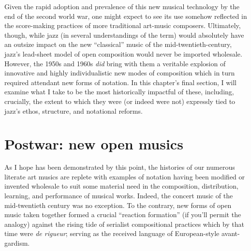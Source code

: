     Given the rapid adoption and prevalence of this new musical technology by the end of the second world war, one might expect to see its use somehow reflected in the score-making practices of more traditional art-music composers. Ultimately, though, while jazz (in several understandings of the term) would absolutely have an outsize impact on the new ``classical'' music of the mid-twentieth-century, jazz's lead-sheet model of open composition would never be imported wholesale. However, the 1950s and 1960s \textit{did} bring with them a veritable explosion of innovative and highly individualistic new modes of composition which in turn required attendant new forms of notation. In this chapter's final section, I will examine what I take to be the most historically impactful of these, including, crucially, the extent to which they were (or indeed were not) expressly tied to jazz's ethos, structure, and notational reforms.

   


        
    
    \section[Postwar: new open musics]{Postwar: new open musics}

    As I hope has been demonstrated by this point, the histories of our numerous literate art musics are replete with examples of notation having been modified or invented wholesale to suit some material need in the composition, distribution, learning, and performance of musical works. Indeed, the concert music of the mid-twentieth century was no exception. To the contrary, new forms of open music taken together formed a crucial ``reaction formation'' (if you'll permit the analogy) against the rising tide of serialist compositional practices which by that time were \textit{de rigueur}; serving as the received language of European-style avant-gardism.\autocite[14-5]{Taruskin_2009d}

